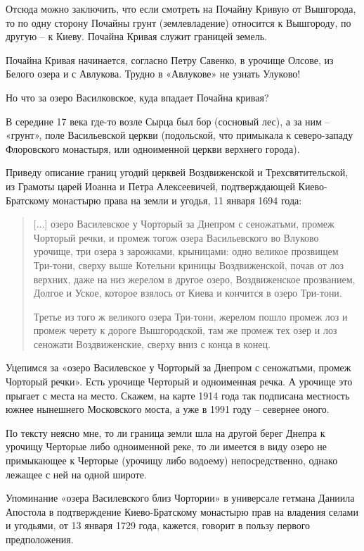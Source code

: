Отсюда можно заключить, что если смотреть на Почайну Кривую от Вышгорода, то по одну сторону Почайны грунт (землевладение) относится к Вышгороду, по другую – к Киеву. Почайна Кривая служит границей земель.

Почайна Кривая начинается, согласно Петру Савенко, в урочище Олсове, из Белого озера и с Авлукова. Трудно в «Авлукове» не узнать Улуково! 

Но что за озеро Василковское, куда впадает Почайна кривая?

В середине 17 века где-то возле Сырца был бор (сосновый лес), а за ним – «грунт», поле Васильевской церкви (подольской, что примыкала к северо-западу Флоровского монастыря, или одноименной церкви верхнего города).

Приведу описание границ угодий церквей Воздвиженской и Трехсвятительской, из Грамоты царей Иоанна и Петра Алексеевичей, подтверждающей Киево-Братскому монастырю права на земли и угодья, 11 января 1694 года:

\begin{quotation}
[...] озеро Василевское у Чорторый за Днепром с сеножатьми, промеж Чорторый речки, и промеж тогож озера Васильевского во Влуково урочище, три озера з зарожками, крыницами: одно великое прозвищем Три-тони, сверху выше Котельни криницы Воздвиженской, почав от лоз верхних, даже на низ жерелом в другое озеро, Воздвиженское прозванием, Долгое и Уское, которое взялось от Киева и кончится в озеро Три-тони.

Третье из того ж великого озера Три-тони, жерелом пошло промеж лоз и промеж черету к дороге Вышгородской, там же промеж тех озер и лоз сеножати Воздвиженские, сверху вниз с конца в конец.
\end{quotation}

Уцепимся за «озеро Василевское у Чорторый за Днепром с сеножатьми, промеж Чорторый речки». Есть урочище Черторый и одноименная речка. А урочище это прыгает с места на место. Скажем, на карте 1914 года так подписана местность южнее нынешнего Московского моста, а уже в 1991 году – севернее оного.

По тексту неясно мне, то ли граница земли шла на другой берег Днепра к урочищу Черторые либо одноименной реке, то ли имеется в виду озеро не примыкающее к Черторые (урочищу либо водоему) непосредственно, однако лежащее с ней на одной широте.

Упоминание «озера Василевского близ Чортории» в универсале гетмана Даниила Апостола в подтверждение Киево-Братскому монастырю прав на владения селами и угодьями, от 13 января 1729 года, кажется, говорит в пользу первого предположения.

